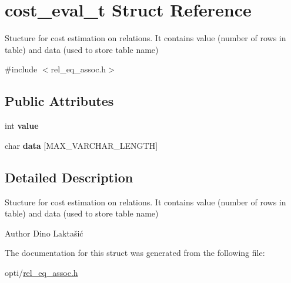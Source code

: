 \hypertarget{structcost__eval__t}{}\section{cost\+\_\+eval\+\_\+t Struct Reference}
\label{structcost__eval__t}


Stucture for cost estimation on relations. It contains value (number of rows in table) and data (used to store table name)  




{\ttfamily \#include $<$rel\+\_\+eq\+\_\+assoc.\+h$>$}

\subsection*{Public Attributes}
\begin{DoxyCompactItemize}
\item 
int {\bfseries value}\hypertarget{structcost__eval__t_ab6682b6adcf408d8d22ed0b7f03ca5d9}{}\label{structcost__eval__t_ab6682b6adcf408d8d22ed0b7f03ca5d9}

\item 
char {\bfseries data} \mbox{[}M\+A\+X\+\_\+\+V\+A\+R\+C\+H\+A\+R\+\_\+\+L\+E\+N\+G\+TH\mbox{]}\hypertarget{structcost__eval__t_ad33dd7ac629ddfbacc965bc1cf5f07ac}{}\label{structcost__eval__t_ad33dd7ac629ddfbacc965bc1cf5f07ac}

\end{DoxyCompactItemize}


\subsection{Detailed Description}
Stucture for cost estimation on relations. It contains value (number of rows in table) and data (used to store table name) 

\begin{DoxyAuthor}{Author}
Dino Laktašić 
\end{DoxyAuthor}


The documentation for this struct was generated from the following file\+:\begin{DoxyCompactItemize}
\item 
opti/\hyperlink{rel__eq__assoc_8h}{rel\+\_\+eq\+\_\+assoc.\+h}\end{DoxyCompactItemize}
